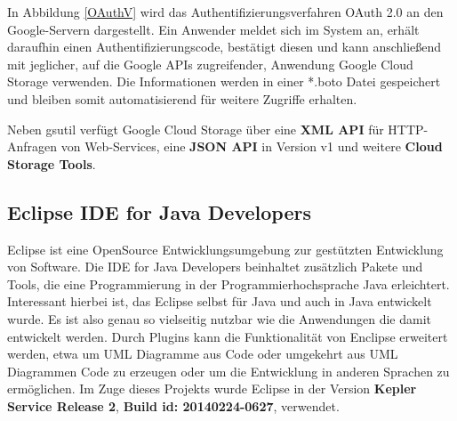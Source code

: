 \documentclass[12pt,a4paper,bibliography=totocnumbered,listof=totocnumbered]{scrartcl}
\begin{document}
In Abbildung \ref{OAuthV} wird das Authentifizierungsverfahren OAuth 2.0 an den Google-Servern dargestellt. Ein Anwender meldet sich im System an, erhält daraufhin einen Authentifizierungscode, bestätigt diesen und kann anschließend mit jeglicher, auf die Google APIs zugreifender, Anwendung Google Cloud Storage verwenden. Die Informationen werden in einer *.boto Datei gespeichert und bleiben somit automatisierend für weitere Zugriffe erhalten. \cite{46}

Neben gsutil verfügt Google Cloud Storage über eine \textbf{XML API} für HTTP-Anfragen von Web-Services, eine \textbf{JSON API} in Version v1 und weitere \textbf{Cloud Storage Tools}.

\subsection{Eclipse IDE for Java Developers}
Eclipse ist eine OpenSource Entwicklungsumgebung zur gestützten Entwicklung von Software. Die IDE for Java Developers beinhaltet zusätzlich Pakete und Tools, die eine Programmierung in der Programmierhochsprache Java erleichtert. Interessant hierbei ist, das Eclipse selbst für Java und auch in Java entwickelt wurde. Es ist also genau so vielseitig nutzbar wie die Anwendungen die damit entwickelt werden. Durch Plugins kann die Funktionalität von Enclipse erweitert werden, etwa um UML Diagramme aus Code oder umgekehrt aus UML Diagrammen Code zu erzeugen oder um die Entwicklung in anderen Sprachen zu ermöglichen. Im Zuge dieses Projekts wurde Eclipse in der Version \textbf{Kepler Service Release 2}, \textbf{Build id: 20140224-0627}, verwendet.
\end{document}
